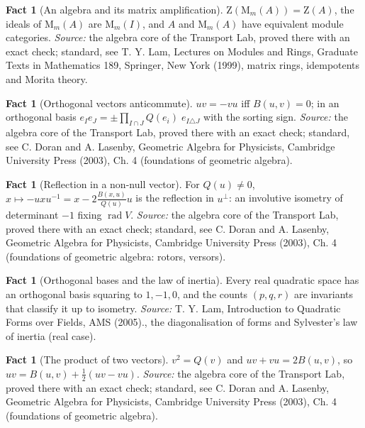\documentclass[11pt]{article}
\theoremstyle{definition}
\newtheorem{fact}[theorem]{Fact}
\theoremstyle{plain}
\providecommand{\Mat}{}\renewcommand{\Mat}{\mathrm{M}}
\providecommand{\Zc}{}\renewcommand{\Zc}{\mathrm{Z}}
\begin{document}
\begin{fact}[An algebra and its matrix amplification]\label{c:std-algebra.morita-amplification}
$\Zc(\Mat_m(A)) = \Zc(A)$, the ideals of $\Mat_m(A)$ are $\Mat_m(I)$, and $A$ and $\Mat_m(A)$ have equivalent module categories.
\emph{Source:} the algebra core of the Transport Lab, proved there with an exact check; standard, see T. Y. Lam, Lectures on Modules and Rings, Graduate Texts in Mathematics 189, Springer, New York (1999), matrix rings, idempotents and Morita theory.
\end{fact}

\begin{fact}[Orthogonal vectors anticommute]\label{c:std-algebra.orthogonal-anticommute}
$uv = -vu$ iff $B(u,v) = 0$; in an orthogonal basis $e_I e_J = \pm \prod_{I \cap J} Q(e_i)\; e_{I \triangle J}$ with the sorting sign.
\emph{Source:} the algebra core of the Transport Lab, proved there with an exact check; standard, see C. Doran and A. Lasenby, Geometric Algebra for Physicists, Cambridge University Press (2003), Ch. 4 (foundations of geometric algebra).
\end{fact}

\begin{fact}[Reflection in a non-null vector]\label{c:std-algebra.reflection}
For $Q(u) \ne 0$, $x \mapsto -uxu^{-1} = x - 2\frac{B(x,u)}{Q(u)}u$ is the reflection in $u^{\perp}$: an involutive isometry of determinant $-1$ fixing $\operatorname{rad} V$.
\emph{Source:} the algebra core of the Transport Lab, proved there with an exact check; standard, see C. Doran and A. Lasenby, Geometric Algebra for Physicists, Cambridge University Press (2003), Ch. 4 (foundations of geometric algebra: rotors, versors).
\end{fact}

\begin{fact}[Orthogonal bases and the law of inertia]\label{c:std-algebra.sylvester-inertia}
Every real quadratic space has an orthogonal basis squaring to $1, -1, 0$, and the counts $(p, q, r)$ are invariants that classify it up to isometry.
\emph{Source:} T. Y. Lam, Introduction to Quadratic Forms over Fields, AMS (2005)., the diagonalisation of forms and Sylvester's law of inertia (real case).
\end{fact}

\begin{fact}[The product of two vectors]\label{c:std-algebra.vector-squares}
$v^{2} = Q(v)$ and $uv + vu = 2B(u, v)$, so $uv = B(u, v) + \tfrac12(uv - vu)$.
\emph{Source:} the algebra core of the Transport Lab, proved there with an exact check; standard, see C. Doran and A. Lasenby, Geometric Algebra for Physicists, Cambridge University Press (2003), Ch. 4 (foundations of geometric algebra).
\end{fact}
\end{document}
